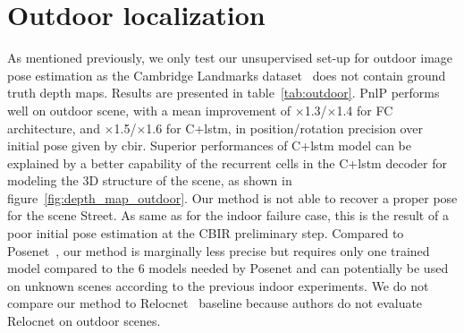 \section{Outdoor localization}
\label{subseq:outdoor}



As mentioned previously, we only test our unsupervised set-up for outdoor image pose estimation as the Cambridge Landmarks dataset~\citep{Kendall2015} does not contain ground truth depth maps. Results are presented in table~\ref{tab:outdoor}. PnlP performs well on outdoor scene, with a mean improvement of $\times$1.3/$\times$1.4 for FC architecture, and $\times$1.5/$\times$1.6 for C+\ac{lstm}, in position/rotation precision over initial pose given by \ac{cbir}. Superior performances of C+\ac{lstm} model can be explained by a better capability of the recurrent cells in the C+\ac{lstm} decoder for modeling the 3D structure of the scene, as shown in figure~\ref{fig:depth_map_outdoor}. Our method is not able to recover a proper pose for the scene Street. As same as for the indoor failure case, this is the result of a poor initial pose estimation at the CBIR preliminary step. Compared to Posenet~\citep{Kendall2017}, our method is marginally less precise but requires only one trained model compared to the 6 models needed by Posenet and can potentially be used on unknown scenes according to the previous indoor experiments. We do not compare our method to Relocnet~\citep{Purkait2018} baseline because authors do not evaluate Relocnet on outdoor scenes.



